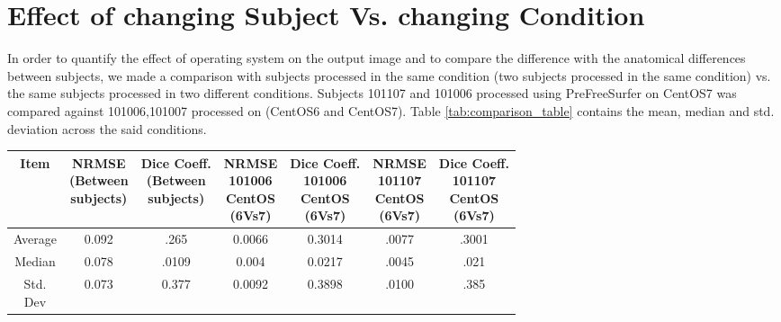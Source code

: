 \section{Effect of changing Subject Vs. changing Condition}\label{sec:comparison}
In order to quantify the effect of operating system on the output image and to compare the difference with the anatomical differences between subjects, we made a comparison with subjects processed in the same condition (two subjects processed in the same condition) vs. the same subjects processed in two different conditions. Subjects 101107 and 101006 processed using PreFreeSurfer on CentOS7 was compared against 101006,101007 processed on (CentOS6 and CentOS7). Table \ref{tab:comparison_table} contains the mean, median and std. deviation across the said conditions.

\hfill \break
\begin{center}
\begin{tabularx}{.99\textwidth}{|c|c|c|c|c|c|c|}
\hline
Item  & \makecell[l]{NRMSE\\(Between\\subjects)} & \makecell[l]{Dice Coeff.\\(Between\\subjects)} & \makecell[l]{NRMSE\\101006\\CentOS\\(6Vs7)} & \makecell[l]{Dice Coeff.\\ 101006\\CentOS\\(6Vs7)} & \makecell[l]{NRMSE\\101107\\CentOS\\(6Vs7)} & \makecell[l]{Dice Coeff.\\ 101107\\CentOS\\(6Vs7)} \\ \hline
Average            & 0.092        & .265      & 0.0066     & 0.3014   & .0077   & .3001     \\ \hline
Median             & 0.078    & .0109       & 0.004          & 0.0217           & .0045     & .021  \\ \hline
\makecell[l]{Std.\\Dev} & 0.073     & 0.377           & 0.0092         & 0.3898   & .0100       & .385 \\ \hline
\end{tabularx}
\label{tab:comparison_table}
\end{center}
